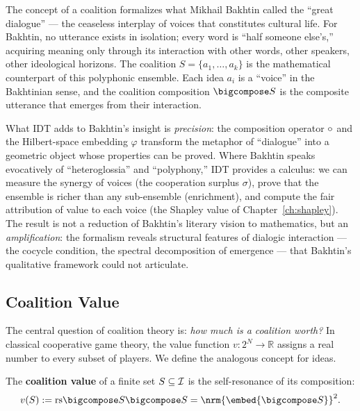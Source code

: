 \begin{interpretation}
\label{interp:ch15:bakhtin_great_dialogue}
The concept of a coalition formalizes what Mikhail Bakhtin called the ``great dialogue'' --- the ceaseless
interplay of voices that constitutes cultural life.  For Bakhtin, no utterance
exists in isolation; every word is ``half someone else's,'' acquiring meaning
only through its interaction with other words, other speakers, other
ideological horizons.  The coalition $S = \{a_1, \ldots, a_k\}$ is the
mathematical counterpart of this polyphonic ensemble.  Each idea $a_i$ is a
``voice'' in the Bakhtinian sense, and the coalition composition
$\bigcompose S$ is the composite utterance that emerges from their
interaction.

What IDT adds to Bakhtin's insight is \emph{precision}: the composition
operator $\circ$ and the Hilbert-space embedding $\varphi$ transform
the metaphor of ``dialogue'' into a geometric object whose properties can be
proved.  Where Bakhtin speaks evocatively of ``heteroglossia'' and
``polyphony,'' IDT provides a calculus: we can measure the synergy of
voices (the cooperation surplus $\sigma$), prove that the ensemble is
richer than any sub-ensemble (enrichment), and compute the fair attribution
of value to each voice (the Shapley value of Chapter~\ref{ch:shapley}).
The result is not a reduction of Bakhtin's literary vision to mathematics,
but an \emph{amplification}: the formalism reveals structural features of
dialogic interaction --- the cocycle condition, the spectral decomposition
of emergence --- that Bakhtin's qualitative framework could not articulate.
\end{interpretation}

\subsection{Coalition Value}

The central question of coalition theory is: \emph{how much is a coalition
worth?}  In classical cooperative game theory, the value function
$v\colon 2^N \to \mathbb{R}$ assigns a real number to every subset of
players.  We define the analogous concept for ideas.

\begin{definition}
\label{def:coalition-value}
The \textbf{coalition value} of a finite set $S \subseteq \mathcal{I}$ is the
self-resonance of its composition:
\[
  v(S) := \rs{\bigcompose S}{\bigcompose S} = \nrm{\embed{\bigcompose S}}^2.
\]
\end{definition}


